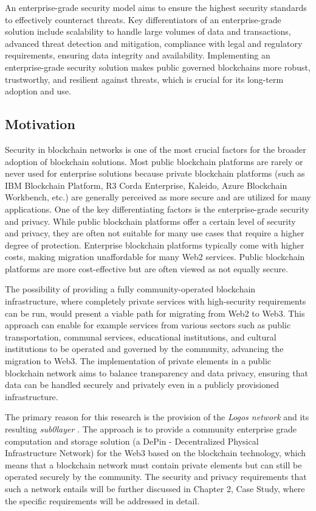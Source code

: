 An enterprise-grade security model aims to ensure the highest security standards to effectively counteract threats. Key differentiators of an enterprise-grade solution include scalability to handle large volumes of data and transactions, advanced threat detection and mitigation, compliance with legal and regulatory requirements, ensuring data integrity and availability. Implementing an enterprise-grade security solution makes public governed blockchains more robust, trustworthy, and resilient against threats, which is crucial for its long-term adoption and use.

\subsection{Motivation}
Security in blockchain networks is one of the most crucial factors for the broader adoption of blockchain solutions. Most public blockchain platforms are rarely or never used for enterprise solutions because private blockchain platforms (such as IBM Blockchain Platform, R3 Corda Enterprise, Kaleido, Azure Blockchain Workbench, etc.) are generally perceived as more secure and are utilized for many applications. One of the key differentiating factors is the enterprise-grade security and privacy. While public blockchain platforms offer a certain level of security and privacy, they are often not suitable for many use cases that require a higher degree of protection. Enterprise blockchain platforms typically come with higher costs, making migration unaffordable for many Web2 services. Public blockchain platforms are more cost-effective but are often viewed as not equally secure.

The possibility of providing a fully community-operated blockchain infrastructure, where completely private services with high-security requirements can be run, would present a viable path for migrating from Web2 to Web3. This approach can enable for example services from various sectors such as public transportation, communal services, educational institutions, and cultural institutions to be operated and governed by the community, advancing the migration to Web3. The implementation of private elements in a public blockchain network aims to balance transparency and data privacy, ensuring that data can be handled securely and privately even in a publicly provisioned infrastructure.

The primary reason for this research is the provision of the \textit{Logos network} \cite{AboutLogosNetworkDocs} and its resulting \textit{sub0layer} \cite{sub0layerBlog}. The approach is to provide a community enterprise grade computation and storage solution (a DePin - Decentralized Physical Infrastructure Network) for the Web3 based on the blockchain technology, which means that a blockchain network must contain private elements but can still be operated securely by the community. The security and privacy requirements that such a network entails will be further discussed in Chapter 2, Case Study, where the specific requirements will be addressed in detail.

